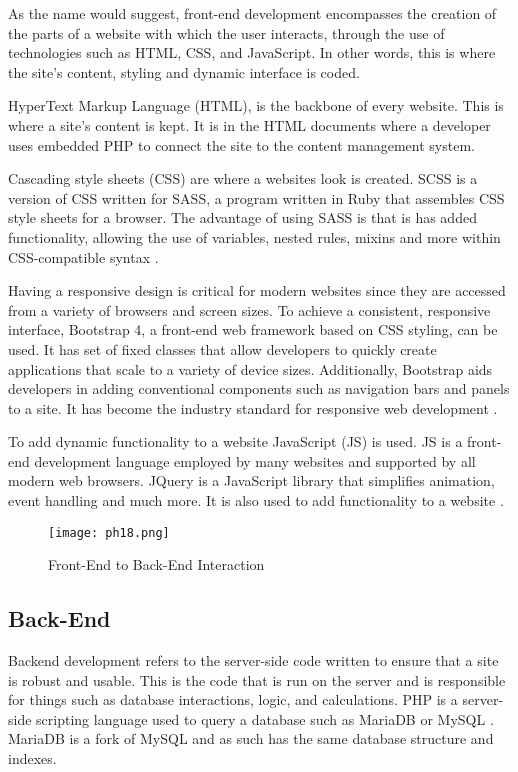 \documentclass[fontsize=11pt]{extarticle}
\numberwithin{figure}{section} %
\numberwithin{table}{section}%
\begin{document}
As the name would suggest, front-end development encompasses the
creation of the parts of a website with which the user interacts,
through the use of technologies such as HTML, CSS, and JavaScript. In
other words, this is where the site's content, styling and dynamic
interface is coded.

HyperText Markup Language (HTML), is the backbone of every website. This
is where a site's content is kept. It is in the HTML documents where a
developer uses embedded PHP to connect the site to the content
management system.

Cascading style sheets (CSS) are where a websites look is created. SCSS
is a version of CSS written for SASS, a program written in Ruby that
assembles CSS style sheets for a browser. The advantage of using SASS is
that is has added functionality, allowing the use of variables, nested
rules, mixins and more within CSS-compatible syntax \cite{p14}.

Having a responsive design is critical for modern websites since they
are accessed from a variety of browsers and screen sizes. To achieve a
consistent, responsive interface, Bootstrap 4, a front-end web framework
based on CSS styling, can be used. It has set of fixed classes that
allow developers to quickly create applications that scale to a variety
of device sizes. Additionally, Bootstrap aids developers in adding
conventional components such as navigation bars and panels to a site. It
has become the industry standard for responsive web development
\cite{p15}.

To add dynamic functionality to a website JavaScript (JS) is used. JS is
a front-end development language employed by many websites and supported
by all modern web browsers. JQuery is a JavaScript library that
simplifies animation, event handling and much more. It is also used to
add functionality to a website \cite{p16}.

\begin{figure}[H]
      \centering
      \texttt{[image: ph18.png]}
      \caption{Front-End to Back-End Interaction}
 \end{figure}

\hypertarget{back-end}{%
\subsection{Back-End}\label{back-end}}

Backend development refers to the server-side code written to ensure
that a site is robust and usable. This is the code that is run on the
server and is responsible for things such as database interactions,
logic, and calculations. PHP is a server-side scripting language used to
query a database such as MariaDB or MySQL \cite{p17}. MariaDB is a fork
of MySQL and as such has the same database structure and indexes.
\end{document}
